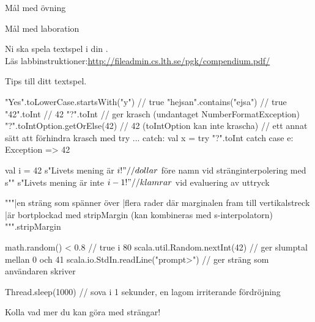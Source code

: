



\ifkompendium\else
{}

\begin{SlideExtra}{Mål med övning \ExeWeekTHREE}
\begin{itemize}\SlideFontSmall
  
\end{itemize}
\end{SlideExtra}

\begin{SlideExtra}{Mål med laboration \LabWeekTHREE}
\begin{itemize}
  
\end{itemize}
Ni ska spela  textspel i din .\\
Läs labbinstruktioner:\url{http://fileadmin.cs.lth.se/pgk/compendium.pdf/}
\end{SlideExtra}


\begin{SlideExtra}{Tips till ditt textspel.}
\begin{CodeSmall}
"Yes".toLowerCase.startsWith("y")    // true
"hejsan".contains("ejsa")            // true
"42".toInt                           // 42 
"?".toInt                            // ger krasch (undantaget NumberFormatException)
"?".toIntOption.getOrElse(42)        // 42 (toIntOption kan inte krascha)
// ett annat sätt att förhindra krasch med try ... catch:
val x = try { "?".toInt } catch { case e: Exception => 42 }

val i = 42
s"Livets mening är $i!" // dollar $ före namn vid stränginterpolering med s""
s"Livets mening är inte ${i-1}!"  // klamrar ${} vid evaluering av uttryck

"""|en sträng som spänner över
   |flera rader där marginalen fram till vertikalstreck
   |är bortplockad med stripMargin (kan kombineras med s-interpolatorn)
""".stripMargin

math.random() < 0.8                  // true i 80%
scala.util.Random.nextInt(42)      // ger slumptal mellan 0 och 41
scala.io.StdIn.readLine("prompt>") // ger sträng som användaren skriver

Thread.sleep(1000)    // sova i 1 sekunder, en lagom irriterande fördröjning
\end{CodeSmall}
Kolla  vad mer du kan göra med strängar!
\end{SlideExtra}

